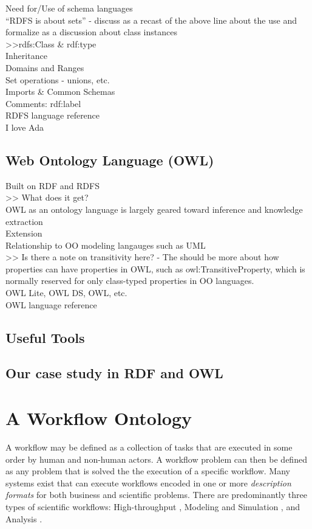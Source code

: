 Need for/Use of schema languages\\
``RDFS is about sets'' - discuss as a recast of the above line about the use and
formalize as a discussion about class instances\\
>>rdfs:Class \& rdf:type\\
Inheritance\\
Domains and Ranges\\
Set operations - unions, etc.\\
Imports \& Common Schemas\\
Comments: rdf:label\\
RDFS language reference\\

I love Ada

\subsection{Web Ontology Language (OWL)}

Built on RDF and RDFS\\
>> What does it get?\\
OWL as an ontology language is largely geared toward inference and knowledge
extraction\\
Extension\\
Relationship to OO modeling langauges such as UML\\
>> Is there a note on transitivity here? - The should be more about how
properties can have properties in OWL, such as owl:TransitiveProperty, which is
normally reserved for only class-typed properties in OO languages.\\
OWL Lite, OWL DS, OWL, etc.\\
OWL language reference\\

\subsection{Useful Tools}

\subsection{Our case study in RDF and OWL}

\section{A Workflow Ontology}

A workflow may be defined as a collection of tasks that are executed in some
order by human and non-human actors. A workflow problem can then be defined as
any problem that is solved the the execution of a specific workflow. Many
systems exist that can execute workflows encoded in one or more
\textit{description formats} for both business and scientific problems. There
are predominantly three types of scientific workflows: High-throughput \cite{},
Modeling and Simulation \cite{}, and Analysis \cite{}.

